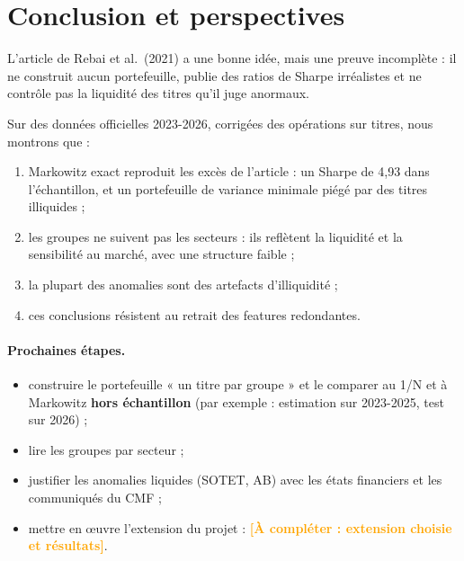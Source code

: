 \documentclass[11pt,a4paper]{article}
\newcommand{\afaire}[1]{\textcolor{orange}{\textbf{[À compléter : #1]}}}
\begin{document}
\section*{Conclusion et perspectives}
L'article de Rebai et al.\ (2021) a une bonne idée, mais une preuve incomplète : il ne construit aucun portefeuille, publie des ratios de Sharpe irréalistes et ne contrôle pas la liquidité des titres qu'il juge anormaux.

Sur des données officielles 2023-2026, corrigées des opérations sur titres, nous montrons que :
\begin{enumerate}
  \item Markowitz exact reproduit les excès de l'article : un Sharpe de 4,93 dans l'échantillon, et un portefeuille de variance minimale piégé par des titres illiquides ;
  \item les groupes ne suivent pas les secteurs : ils reflètent la liquidité et la sensibilité au marché, avec une structure faible ;
  \item la plupart des anomalies sont des artefacts d'illiquidité ;
  \item ces conclusions résistent au retrait des features redondantes.
\end{enumerate}

\paragraph{Prochaines étapes.}
\begin{itemize}
  \item construire le portefeuille « un titre par groupe » et le comparer au 1/N et à Markowitz \textbf{hors échantillon} (par exemple : estimation sur 2023-2025, test sur 2026) ;
  \item lire les groupes par secteur ;
  \item justifier les anomalies liquides (SOTET, AB) avec les états financiers et les communiqués du CMF ;
  \item mettre en œuvre l'extension du projet : \afaire{extension choisie et résultats}.
\end{itemize}

\clearpage
\end{document}
